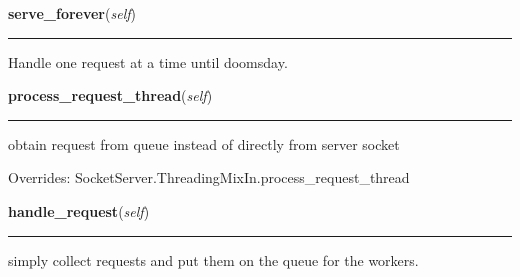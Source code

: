     \label{ThreadPool:ThreadPoolMixIn:serve_forever}

    \vspace{0.5ex}

\hspace{.8\funcindent}\begin{boxedminipage}{\funcwidth}

    \raggedright \textbf{serve\_forever}(\textit{self})

    \vspace{-1.5ex}

    \rule{\textwidth}{0.5\fboxrule}
\setlength{\parskip}{2ex}
    Handle one request at a time until doomsday.

\setlength{\parskip}{1ex}
    \end{boxedminipage}

    \vspace{0.5ex}

\hspace{.8\funcindent}\begin{boxedminipage}{\funcwidth}

    \raggedright \textbf{process\_request\_thread}(\textit{self})

    \vspace{-1.5ex}

    \rule{\textwidth}{0.5\fboxrule}
\setlength{\parskip}{2ex}
    obtain request from queue instead of directly from server socket

\setlength{\parskip}{1ex}
      Overrides: SocketServer.ThreadingMixIn.process\_request\_thread

    \end{boxedminipage}

    \label{ThreadPool:ThreadPoolMixIn:handle_request}

    \vspace{0.5ex}

\hspace{.8\funcindent}\begin{boxedminipage}{\funcwidth}

    \raggedright \textbf{handle\_request}(\textit{self})

    \vspace{-1.5ex}

    \rule{\textwidth}{0.5\fboxrule}
\setlength{\parskip}{2ex}
    simply collect requests and put them on the queue for the workers.

\setlength{\parskip}{1ex}
    \end{boxedminipage}


